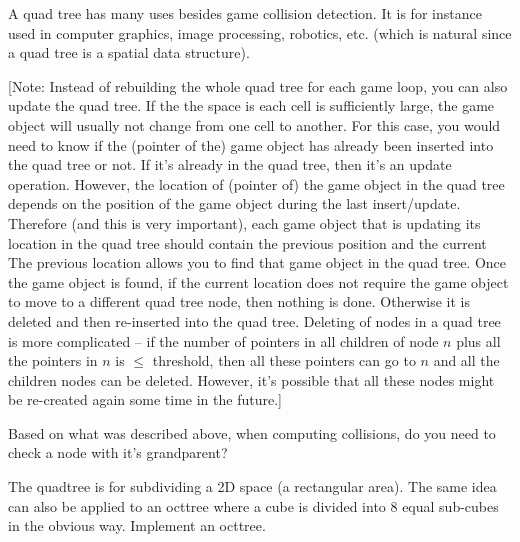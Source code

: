 A quad tree has many uses besides game collision detection.
It is for instance used in computer graphics, image processing,
robotics, etc.
(which is natural since a quad tree is a spatial data structure).

[Note: Instead of rebuilding the whole quad tree for each
game loop, you can also update the quad tree. If the the space
is each cell is sufficiently large, the game object will
usually not change from one cell to another.
For this case, you would need to know if the (pointer of the) game object
has already been inserted into the quad tree or not.
If it's already in the quad tree, then it's an update operation.
However, the location of (pointer of) the game object in the quad tree
depends on the position of the game object during the last insert/update.
Therefore (and this is very important), each game object that is
updating its location in the quad tree
should contain the previous position and the current
The previous location allows you to find that game object in the
quad tree. Once the game object is found, if the current location
does not require the game object to move to a different quad tree node,
then nothing is done.
Otherwise it is deleted and then re-inserted into the
quad tree. Deleting of nodes in a quad tree is more complicated --
if the number of pointers in all children of node $n$
plus all the pointers in $n$ is $\leq$ threshold, then
all these pointers can go to $n$ and all the children nodes can be
deleted. However, it's possible that all these nodes might be re-created
again some time in the future.]



\begin{ex}
  Based on what was described above, when computing
  collisions, do you need to check a node with
  it's grandparent?
\end{ex}
  
\begin{ex}
The quadtree is for subdividing a 2D space (a rectangular area).
The same idea can also be applied to an octtree where
a cube is divided into 8 equal sub-cubes in the obvious way.
Implement an octtree.
\end{ex}


